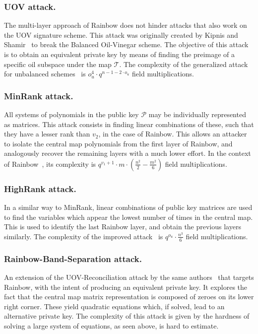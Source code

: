 \documentclass[draft, 12pt, a4paper, oneside]{memoir}
\theoremstyle{definition}
\begin{document}
\subsubsection{UOV attack.} The multi-layer approach of Rainbow does not hinder
attacks that also work on the UOV signature scheme. This attack was originally
created by Kipnis and Shamir~\cite{Kipnis:199808} to break the Balanced
Oil-Vinegar scheme. The objective of this attack is to obtain an equivalent
private key by means of finding the preimage of a specific oil subspace under
the map $\mathcal{T}$. The complexity of the generalized attack for unbalanced
schemes~\cite{Kipnis:199904} is
$o_{u}^{4} \cdot q^{n - 1 - 2 \cdot o_{u}}$ field multiplications.

\subsubsection{MinRank attack.} All systems of polynomials in the public key
$\mathcal{P}$ may be individually represented as matrices. This attack
consists in finding linear combinations of these, such that they have a lesser
rank than $v_{2}$, in the case of Rainbow. This allows an attacker to isolate
the central map polynomials from the first layer of Rainbow, and analogously
recover the remaining layers with a much lower effort. In the context of
Rainbow~\cite{Billet:200609}, its complexity is
$q^{v_{1} + 1} \cdot m \cdot (\frac{n^{2}}{2} - \frac{m^{2}}{6})$ field
multiplications.

\subsubsection{HighRank attack.} In a similar way to MinRank, linear
combinations of public key matrices are used to find the variables which
appear the lowest number of times in the central map. This is used to identify
the last Rainbow layer, and obtain the previous layers similarly. The
complexity of the improved attack~\cite{Ding:200806} is
$q^{o_{u}} \cdot \frac{n^{3}}{6}$ field multiplications.

\subsubsection{Rainbow-Band-Separation attack.} An extension of the
UOV-Reconciliation attack by the same authors~\cite{Ding:200806} that
targets Rainbow, with the intent of producing an equivalent private key. It
explores the fact that the central map matrix representation is composed of
zeroes on its lower right corner. These yield quadratic equations which, if
solved, lead to an alternative private key. The complexity of this attack is
given by the hardness of solving a large system of equations, as seen
above, is hard to estimate.
\end{document}
